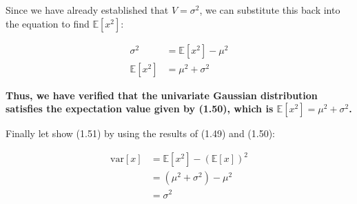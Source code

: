 \documentclass{article}
\begin{document}
\begin{tcolorbox}[breakable,colback=gray!5,colframe=gray!60,title=Solution]
Since we have already established that \( V = \sigma^2 \), we can substitute this back into the equation to find \( \mathbb{E}[x^2] \):

\begin{align*}
\sigma^2 &= \mathbb{E}[x^2] - \mu^2 \\
\mathbb{E}[x^2] &= \mu^2 + \sigma^2
\end{align*}

\textbf{Thus, we have verified that the univariate Gaussian distribution satisfies the expectation value given by (1.50), which is \( \mathbb{E}[x^2] = \mu^2 + \sigma^2 \).}

\vspace{1em}

Finally let show (1.51) by using the results of (1.49) and (1.50):

\begin{align*}
\text{var}[x] &= \mathbb{E}[x^2] - (\mathbb{E}[x])^2 \\
&= (\mu^2 + \sigma^2) - \mu^2 \\
&= \sigma^2
\end{align*}
\end{tcolorbox}
\end{document}
